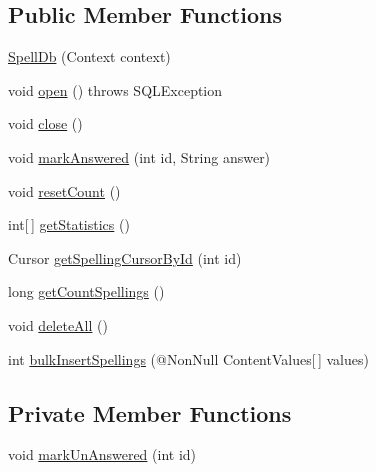 \subsection*{Public Member Functions}
\begin{DoxyCompactItemize}
\item 
\hyperlink{classorg_1_1buildmlearn_1_1toolkit_1_1learnspelling_1_1data_1_1SpellDb_a6d44e0388ccb16e8de1e928fe2e748fe}{Spell\+Db} (Context context)
\item 
void \hyperlink{classorg_1_1buildmlearn_1_1toolkit_1_1learnspelling_1_1data_1_1SpellDb_a773f8ffe3f5d39fa5d00527857dbbc4c}{open} ()  throws S\+Q\+L\+Exception 
\item 
void \hyperlink{classorg_1_1buildmlearn_1_1toolkit_1_1learnspelling_1_1data_1_1SpellDb_aba9603e60b67e5879e8a49103383beb8}{close} ()
\item 
void \hyperlink{classorg_1_1buildmlearn_1_1toolkit_1_1learnspelling_1_1data_1_1SpellDb_ab0f41c5eec052829dbfbf65e468846fa}{mark\+Answered} (int id, String answer)
\item 
void \hyperlink{classorg_1_1buildmlearn_1_1toolkit_1_1learnspelling_1_1data_1_1SpellDb_aae589105a7bfce95e5866896c1a9cc44}{reset\+Count} ()
\item 
int\mbox{[}$\,$\mbox{]} \hyperlink{classorg_1_1buildmlearn_1_1toolkit_1_1learnspelling_1_1data_1_1SpellDb_a725ab746fde77c96cf0e29676c0d73f2}{get\+Statistics} ()
\item 
Cursor \hyperlink{classorg_1_1buildmlearn_1_1toolkit_1_1learnspelling_1_1data_1_1SpellDb_add7e3e2e9870e9a3f70b1dacaef3ed5f}{get\+Spelling\+Cursor\+By\+Id} (int id)
\item 
long \hyperlink{classorg_1_1buildmlearn_1_1toolkit_1_1learnspelling_1_1data_1_1SpellDb_aa25b30012828f6e855da547a678ec7c4}{get\+Count\+Spellings} ()
\item 
void \hyperlink{classorg_1_1buildmlearn_1_1toolkit_1_1learnspelling_1_1data_1_1SpellDb_abb05438c8c29b8c82e6b31b11d6675f7}{delete\+All} ()
\item 
int \hyperlink{classorg_1_1buildmlearn_1_1toolkit_1_1learnspelling_1_1data_1_1SpellDb_ad3d0e5673e2819acc5cbebe59dfa1486}{bulk\+Insert\+Spellings} (@Non\+Null Content\+Values\mbox{[}$\,$\mbox{]} values)
\end{DoxyCompactItemize}
\subsection*{Private Member Functions}
\begin{DoxyCompactItemize}
\item 
void \hyperlink{classorg_1_1buildmlearn_1_1toolkit_1_1learnspelling_1_1data_1_1SpellDb_a225206204441a0123294b056202cd7ae}{mark\+Un\+Answered} (int id)
\end{DoxyCompactItemize}
